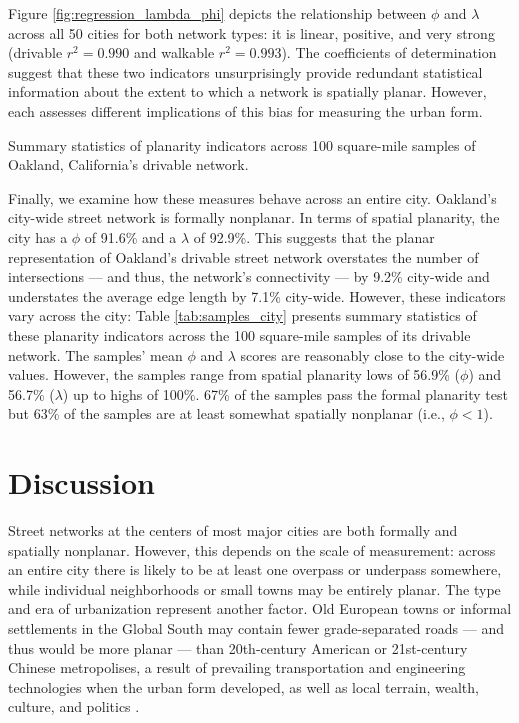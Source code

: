 \documentclass[Afour,sageh,times]{sagej}
\begin{document}
Figure \ref{fig:regression_lambda_phi} depicts the relationship between $\phi$ and $\lambda$ across all 50 cities for both network types: it is linear, positive, and very strong (drivable $r^2=0.990$ and walkable $r^2=0.993$). The coefficients of determination suggest that these two indicators unsurprisingly provide redundant statistical information about the extent to which a network is spatially planar. However, each assesses different implications of this bias for measuring the urban form.

\begin{table}[htbp]
	\centering
	\caption{Summary statistics of planarity indicators across 100 square-mile samples of Oakland, California's drivable network.}
	\label{tab:samples_city}
	
\end{table}

Finally, we examine how these measures behave across an entire city. Oakland's city-wide street network is formally nonplanar. In terms of spatial planarity, the city has a $\phi$ of 91.6\% and a $\lambda$ of 92.9\%. This suggests that the planar representation of Oakland's drivable street network overstates the number of intersections --- and thus, the network's connectivity --- by 9.2\% city-wide and understates the average edge length by 7.1\% city-wide. However, these indicators vary across the city: Table \ref{tab:samples_city} presents summary statistics of these planarity indicators across the 100 square-mile samples of its drivable network. The samples' mean $\phi$ and $\lambda$ scores are reasonably close to the city-wide values. However, the samples range from spatial planarity lows of 56.9\% ($\phi$) and 56.7\% ($\lambda$) up to highs of 100\%. 67\% of the samples pass the formal planarity test but 63\% of the samples are at least somewhat spatially nonplanar (i.e., $\phi < 1$).



\section{Discussion}

Street networks at the centers of most major cities are both formally and spatially nonplanar. However, this depends on the scale of measurement: across an entire city there is likely to be at least one overpass or underpass somewhere, while individual neighborhoods or small towns may be entirely planar. The type and era of urbanization represent another factor. Old European towns or informal settlements in the Global South may contain fewer grade-separated roads --- and thus would be more planar --- than 20th-century American or 21st-century Chinese metropolises, a result of prevailing transportation and engineering technologies when the urban form developed, as well as local terrain, wealth, culture, and politics \citep{southworth_street_1995}.
\end{document}

